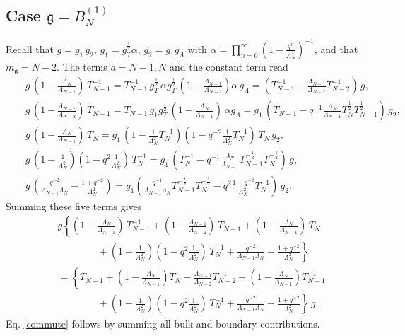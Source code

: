 \documentclass[12pt]{amsart}
\newcommand{\g}{{\mathfrak{g}}}
\newcommand{\al}{{\alpha}}
\newcommand{\lL}{{\Lambda}}
\numberwithin{equation}{section}
\begin{document}
\subsection{Case $\g=B_{N}^{(1)}$}\label{B1sec} Recall that $g=g_1\,g_2$, $g_1=g_T^{\frac{1}{2}} \al$, $g_2= g_1 g_\lL$ with $\al= \prod_{n=0}^\infty \left(1-\frac{q^n}{\lL_N^2}\right)^{-1}$, and that $m_\g=N-2$.
The terms $a=N-1,N$ and the constant term read
\begin{eqnarray*}
&&g\, \left(1-\frac{\Lambda_{N}}{\Lambda_{N-1}}\right) \,T_{N-1}^{-1}=T_{N-1}^{-1}\, g_T^{\frac{1}{2}} \,\al g_T^{\frac{1}{2}} \, 
 \left(1-\frac{\Lambda_{N-1}}{\Lambda_{N-2}}\right) \al \,g_{\Lambda}=\left(T_{N-1}^{-1}-\frac{\Lambda_{N-1}}{\Lambda_{N-2}}T_{N-2}^{-1}\right)\, g,\\
%
%
%
&&g\, \left(1-\frac{\Lambda_{N-1}}{\Lambda_{N-2}}\right) \,T_{N-1}
=T_{N-1}\, g_1 g_T^{\frac{1}{2}}\, \left(1-\frac{\Lambda_{N}}{\Lambda_{N-1}}\right) \,\al g_{\Lambda}
=g_1\, \left(T_{N-1}-q^{-1}\frac{\Lambda_{N}}{\Lambda_{N-1}}T_N^{\frac{1}{2}} T_{N-1}^{\frac{1}{2}}\right) \, g_2,\\
%
%
%
%
&&g\, \left(1-\frac{\Lambda_{N}}{\Lambda_{N-1}}\right) \,T_N=g_{1}\, 
\left(1-\frac{1}{\Lambda_{N}^2}T_N^{-1}\right)\left(1-q^{-2}\frac{1}{\Lambda_{N}^2}T_N^{-1}\right)\, T_N\,g_{2}, \\
%
%
&&g\,\left(1-\frac{1}{\Lambda_{N}^2}\right)\left(1-q^{2}\frac{1}{\Lambda_{N}^2}\right)\,T_N^{-1}
%
%
=g_1\, \left(T_N^{-1}-q^{-1}\frac{\Lambda_{N}}{\Lambda_{N-1}}T_{N-1}^{-\frac{1}{2}}T_{N}^{-\frac{1}{2}}\right)\, g, \\
&&g\, \left(\frac{q^{-2}}{\Lambda_{N-1}\Lambda_N}-\frac{1+q^{-2}}{\Lambda_{N}^2}\right)=
 g_{1} \left(\frac{q^{-1}}{\Lambda_{N-1}\Lambda_N}T_{N-1}^{-\frac{1}{2}}T_{N}^{-\frac{1}{2}}-q^2\frac{1+q^{-2}}{\Lambda_{N}^2}T_N^{-1}\right)\,g_{2} .
%
\end{eqnarray*}
Summing these five terms gives
\begin{eqnarray*}
&&g\left\{\left(1-\frac{\Lambda_{N}}{\Lambda_{N-1}}\right) \,T_{N-1}^{-1}+\left(1-\frac{\Lambda_{N-1}}{\Lambda_{N-2}}\right) \,T_{N-1}+ \left(1-\frac{\Lambda_{N}}{\Lambda_{N-1}}\right) \,T_N \right.\\
&&\qquad\qquad +\left.
\left(1-\frac{1}{\Lambda_{N}^2}\right)\left(1-q^{2}\frac{1}{\Lambda_{N}^2}\right)\,T_N^{-1}+
\frac{q^{-2}}{\Lambda_{N-1}\Lambda_N}-\frac{1+q^{-2}}{\Lambda_{N}^2} \right\}\\
%
%
%
%
%
%
%
%
%
%
%
%
%
%
%
%
%
%
&&=\left\{ T_{N-1}+\left(1-\frac{\Lambda_N}{\Lambda_{N-1}}\right)T_N-\frac{\lL_{N-1}}{\lL_{N-2}}T_{N-2}^{-1}+\left(1-\frac{\Lambda_N}{\Lambda_{N-1}}\right)T_{N-1}^{-1}\right. \\
&&\qquad\qquad  +\left. \left(1-\frac{1}{\Lambda_{N}^2}\right)\left(1-q^{2}\frac{1}{\Lambda_{N}^2}\right)\,T_N^{-1}+\frac{q^{-2}}{\Lambda_{N-1}\Lambda_N}-\frac{1+q^{-2}}{\Lambda_N^2}
 \right\}\, g.
\end{eqnarray*}
Eq. \eqref{commute} follows by summing all bulk and boundary contributions.
\end{document}
